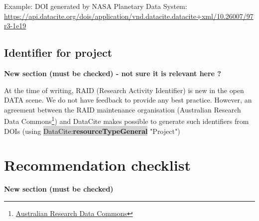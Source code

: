 \documentclass[11pt,a4paper]{ivoa}
\newcommand{\dataciteterm}[1]{\colorbox{lightgray}{DataCite:\textbf{#1}}}
\begin{document}
Example: DOI generated by NASA Planetary Data System:
\url{https://api.datacite.org/dois/application/vnd.datacite.datacite+xml/10.26007/97r3-1e19}



\subsection{Identifier for project}
\textbf{\color{red}New section (must be checked) - not sure it is relevant here ?}

At the time of writing, RAID (Research Activity Identifier) is new in the open DATA scene. We do not have feedback to provide any best practice. However, an agreement between the RAID maintenance organisation (Australian Research Data Commons\footnote{\url{ Australian Research Data Commons}}) and DataCite makes possible to generate such identifiers from DOIs (using \dataciteterm{resourceTypeGeneral} "Project")


\section{Recommendation checklist}
\textbf{\color{red}New section (must be checked)}
\end{document}
